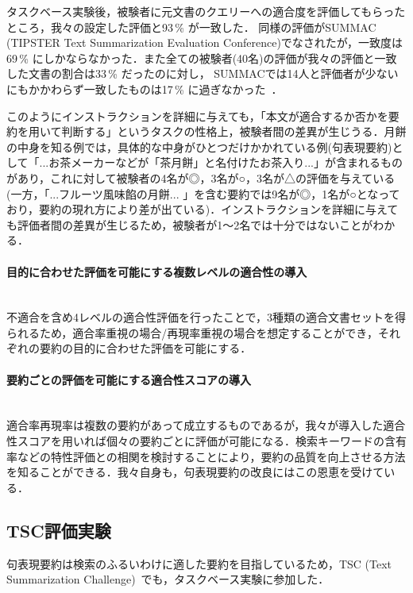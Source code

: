 タスクベース実験後，被験者に元文書のクエリーへの適合度を評価してもらったところ，我々の設定した評価と93\,\% が一致した． 同様の評価がSUMMAC (TIPSTER Text Summarization Evaluation Conference)でなされたが，一致度は69\,\% にしかならなかった．また全ての被験者(40名)の評価が我々の評価と一致した文書の割合は33\,\% だったのに対し， SUMMACでは14人と評価者が少ないにもかかわらず一致したものは17\,\% に過ぎなかった~\cite{mani98}．

このようにインストラクションを詳細に与えても，「本文が適合するか否かを要約を用いて判断する」というタスクの性格上，被験者間の差異が生じうる．月餅の中身を知る例では，具体的な中身がひとつだけかかれている例(句表現要約)として「...お茶メーカーなどが「茶月餅」と名付けたお茶入り...」が含まれるものがあり，これに対して被験者の4名が◎，3名が○，3名が△の評価を与えている(一方，「...フルーツ風味餡の月餅... 」を含む要約では9名が◎，1名が○となっており，要約の現れ方により差が出ている)．インストラクションを詳細に与えても評価者間の差異が生じるため，被験者が1〜2名では十分ではないことがわかる．

\paragraph{目的に合わせた評価を可能にする複数レベルの適合性の導入} ~ \\
\indent
不適合を含め4レベルの適合性評価を行ったことで，3種類の適合文書セットを得られるため，適合率重視の場合/再現率重視の場合を想定することができ，それぞれの要約の目的に合わせた評価を可能にする．

\paragraph{要約ごとの評価を可能にする適合性スコアの導入} ~ \\
\indent
適合率再現率は複数の要約があって成立するものであるが，我々が導入した適合性スコアを用いれば個々の要約ごとに評価が可能になる．検索キーワードの含有率などの特性評価との相関を検討することにより，要約の品質を向上させる方法を知ることができる．我々自身も，句表現要約の改良にはこの恩恵を受けている．


\subsection{TSC評価実験}

句表現要約は検索のふるいわけに適した要約を目指しているため，TSC (Text Summarization Challenge)~\cite{fukushima01}でも，タスクベース実験に参加した．

